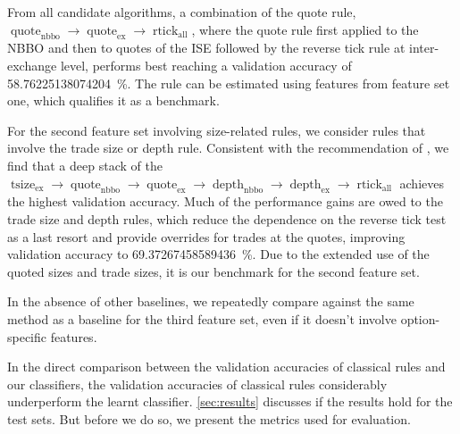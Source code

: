 From all candidate algorithms, a combination of the quote rule, $\operatorname{quote}_{\mathrm{nbbo}} \to \operatorname{quote}_{\mathrm{ex}} \to \operatorname{rtick}_{\mathrm{all}}$, where the quote rule first applied to the \gls{NBBO} and then to quotes of the \gls{ISE} followed by the reverse tick rule at inter-exchange level, performs best reaching a validation accuracy of \SI{58.76225138074204}{\percent}. The rule can be estimated using features from feature set one, which qualifies it as a benchmark.

For the second feature set involving size-related rules, we consider rules that involve the trade size or depth rule. Consistent with the recommendation of \textcite[][14]{grauerOptionTradeClassification2022}, we find that a deep stack of the $\operatorname{tsize}_{\mathrm{ex}} \to \operatorname{quote}_{\mathrm{nbbo}} \to \operatorname{quote}_{\mathrm{ex}} \to \operatorname{depth}_{\mathrm{nbbo}} \to \operatorname{depth}_{\mathrm{ex}} \to \operatorname{rtick}_{\mathrm{all}}$ achieves the highest validation accuracy. Much of the performance gains are owed to the trade size and depth rules, which reduce the dependence on the reverse tick test as a last resort and provide overrides for trades at the quotes, improving validation accuracy to \SI{69.37267458589436}{\percent}. Due to the extended use of the quoted sizes and trade sizes, it is our benchmark for the second feature set.


In the absence of other baselines, we repeatedly compare against the same method as a baseline for the third feature set, even if it doesn't involve option-specific features.

In the direct comparison between the validation accuracies of classical rules and our classifiers, the validation accuracies of classical rules considerably underperform the learnt classifier. \cref{sec:results} discusses if the results hold for the test sets. But before we do so, we present the metrics used
for evaluation.